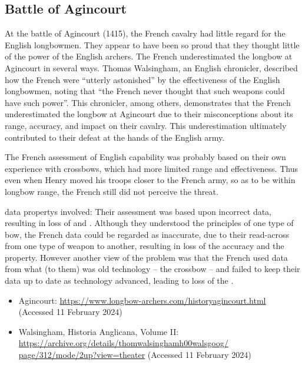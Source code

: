 \subsection{Battle of Agincourt}\label{bkm:incacc:agincourt}
  At the battle of Agincourt (1415), the French cavalry had little regard for the English longbowmen.
  They appear to have been so proud that they thought little of the power of the English
  archers.
  The French underestimated the longbow at Agincourt in several ways.
  Thomas Walsingham, an English chronicler, described how the French were ``utterly astonished''
  by the effectiveness of the English longbowmen,
  noting that ``the French never thought that such weapons could have such power''.
  This chronicler, among others, demonstrates that the French underestimated the longbow at
  Agincourt due to their misconceptions about its range, \gls{accuracy}, and impact on their cavalry.
  This underestimation ultimately contributed to their defeat at the hands of the English army.

  The French assessment of English capability was probably based on their own experience with
  crossbows, which had more limited range and effectiveness. Thus even when Henry moved his troops
  closer to the French army, so as to be within longbow range, the French still did not perceive the threat.

  \Glspl{data property} involved: Their assessment was based upon incorrect data, resulting in loss of 
   and
  .
  Although they understood the principles of one type of bow, the French data could be regarded as
  inaccurate, due to their read-across from one type of weapon to another, resulting in loss of the
  \gls{accuracy} and the
   property.
  However another view of the problem was that the French used data from what (to them) was old
  technology -- the crossbow -- and failed to keep their data up to date as technology advanced,
  leading to loss of the
  .

  \begin{itemize}
  \item Agincourt:
  \href{https://www.longbow-archers.com/historyagincourt.html}
       {https://www.longbow-archers.com/historyagincourt.html}
       (Accessed 11 February 2024)
  \item Walsingham, Historia Anglicana, Volume II:
  \href{https://archive.org/details/thomwalsinghamh00walsgoog/page/312/mode/2up?view=theater}
       {https://archive.org/details/thomwalsinghamh00walsgoog/ page/312/mode/2up?view=theater}
       (Accessed 11 February 2024)

\end{itemize}

